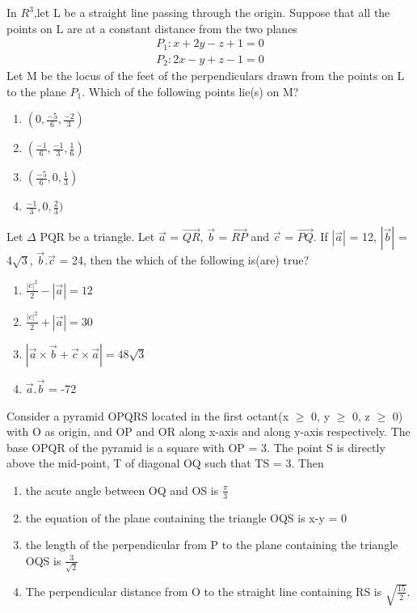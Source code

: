 \item In $R^{3}$,let L be a straight line passing through the origin. Suppose that all the points on L are at a constant distance from the two planes 
\begin{align*}
P_1: x + 2y - z + 1 = 0
\end{align*}
\begin{align*}
P_2: 2x - y + z - 1 = 0
\end{align*}
Let M be the locus of the feet of the perpendiculars drawn from the points on L to the plane $P_1$. Which of the following points lie(s) on M?
\begin{enumerate}
\item $(0, \frac{-5}{6}, \frac{-2}{3})$
\item $(\frac{-1}{6}, \frac{-1}{3}, \frac{1}{6})$
\item $(\frac{-5}{6}, 0, \frac{1}{3})$
\item $\frac{-1}{3}, 0, \frac{2}{3})$
\end{enumerate}

\item Let $\Delta$ PQR be a triangle. Let $\overrightarrow{a}$ = $\overrightarrow{QR}$, $\overrightarrow{b}$ = 
$\overrightarrow{RP}$ and $\overrightarrow{c}$ = $\overrightarrow{PQ}$. If $|\overrightarrow{a}|$ = 12, 
$|\overrightarrow{b}|$ = 4$\sqrt{3}$, $\overrightarrow{b}.\overrightarrow{c}$ = 24, then the which of the following is(are) true?
\begin{enumerate}
\item $\frac{|c|^{2}}{2} - |\overrightarrow{a}| = 12$
\item $\frac{|c|^{2}}{2} + |\overrightarrow{a}| = 30$
\item $|\overrightarrow{a} \times \overrightarrow{b} + \overrightarrow{c} \times \overrightarrow{a}| = 48\sqrt{3}$
\item $\overrightarrow{a}$.$\overrightarrow{b}$ = -72
\end{enumerate}

\item Consider a pyramid OPQRS located in the first octant(x $\geq$ 0, y $\geq$ 0, z $\geq$ 0) with O as origin, and OP and OR along x-axis and along y-axis respectively. The base OPQR of the pyramid is a square with OP = 3. The point S is directly above the mid-point, T of diagonal OQ such that TS = 3. Then
\begin{enumerate}
\item the acute angle between OQ and OS is $\frac{\pi}{3}$
\item the equation of the plane containing the triangle OQS is x-y = 0
\item the length of the perpendicular from P to the plane containing the triangle OQS is $\frac{3}{\sqrt{2}}$
\item The perpendicular distance from O to the straight line containing RS is $\sqrt{\frac{15}{2}}$.
\end{enumerate}

